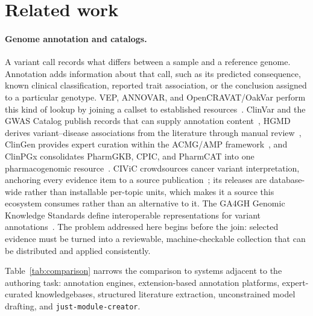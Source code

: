 \documentclass[11pt,a4paper]{article}
\begin{document}
\section{Related work}

\paragraph{Genome annotation and catalogs.}
A variant call records what differs between a sample and a reference genome.
Annotation adds information about that call, such as its predicted consequence,
known clinical classification, reported trait association, or the conclusion
assigned to a particular genotype. VEP, ANNOVAR, and OpenCRAVAT/OakVar perform
this kind of lookup by joining a callset to established
resources~\citep{mclaren2016vep,wang2010annovar,pagel2020opencravat}. ClinVar
and the GWAS Catalog publish records that can supply annotation
content~\citep{landrum2018clinvar,sollis2023gwas}, HGMD derives
variant--disease associations from the literature through manual
review~\citep{stenson2020hgmd}, ClinGen provides expert curation within the
ACMG/AMP framework~\citep{rehm2015clingen,richards2015acmg}, and ClinPGx
consolidates PharmGKB, CPIC, and PharmCAT into one pharmacogenomic
resource~\citep{whirl2012pharmgkb,clinpgx2025,clinpgxabout}. CIViC crowdsources cancer
variant interpretation, anchoring every evidence item to a source
publication~\citep{griffith2017civic}; its releases are database-wide rather
than installable per-topic units, which makes it a source this ecosystem
consumes rather than an alternative to it. The GA4GH Genomic Knowledge
Standards define interoperable representations for variant
annotations~\citep{ga4gh2022gks}. The problem addressed here begins before the
join: selected evidence must be turned into a reviewable, machine-checkable
collection that can be distributed and applied consistently.

Table~\ref{tab:comparison} narrows the comparison to systems adjacent to the
authoring task: annotation engines, extension-based annotation platforms,
expert-curated knowledgebases, structured literature extraction, unconstrained
model drafting, and \texttt{just-module-creator}.
\end{document}
